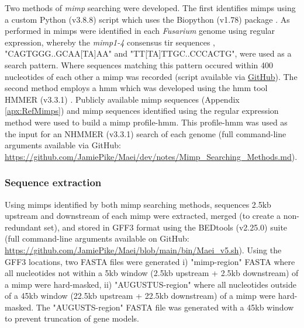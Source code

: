 Two methods of \textit{mimp} searching were developed. The first identifies \acp{mimp} using a custom Python (v3.8.8) script \parencite{Python} which uses the Biopython (v1.78) package \parencite{biopython}. As performed in \textcite{Schmidt2013, Dam2016, Armitage2018} \acp{mimp} were identified in each \textit{Fusarium} genome using regular expression, whereby the \textit{mimp1-4} consensus \ac{tir} sequences \parencite{Bergemann2008, Schmidt2013}, "CAGTGGG..GCAA[TA]AA" and "TT[TA]TTGC..CCCACTG", were used as a search pattern. Where sequences matching this pattern occured within 400 nucleotides of each other a \ac{mimp} was recorded (script available via \href{https://github.com/JamiePike/Maei/blob/main/bin/Mimp_finditer.py}{GitHub}). The second method employs a \acf{hmm} which was developed using the \ac{hmm} tool HMMER (v3.3.1) \parencite{Eddy2011}. Publicly available \ac{mimp} sequences (Appendix \ref{apx:RefMimps}) and \ac{mimp} sequences identified using the regular expression method were used to build a \ac{mimp} profile-\ac{hmm}. This profile-\ac{hmm} was used as the input for an NHMMER (v3.3.1) \parencite{Eddy2011} search of each genome (full command-line arguments available via GitHub: \href{https://github.com/JamiePike/Maei/blob/main/dev/notes/Mimp_Searching_Methods.md}{https://github.com/JamiePike/Maei/dev/notes/Mimp\_Searching\_Methods.md}).

\subsubsection{Sequence extraction}

Using \acp{mimp} identified by both \ac{mimp} searching methods, sequences 2.5kb upstream and downstream of each \ac{mimp} were extracted, merged (to create a non-redundant set), and stored in GFF3 format using the BEDtools (v2.25.0) suite \parencite{Quinlan2010} (full command-line arguments available on GitHub: \href{https://github.com/JamiePike/Maei/blob/main/bin/Maei_v5.sh}{https://github.com/JamiePike/Maei/bl\-ob/main/bin/Maei\_v5.sh}). Using the GFF3 locations, two FASTA files were generated i) "\ac{mimp}-region" FASTA where all nucleotides not within a 5kb window (2.5kb upstream + 2.5kb downstream) of a \ac{mimp} were hard-masked, ii) "AUGUSTUS-region" where all nucleotides outside of a 45kb window (22.5kb upstream + 22.5kb downstream) of a \ac{mimp} were hard-masked. The "AUGUSTS-region" FASTA file was generated with a 45kb window to prevent truncation of gene models. 

